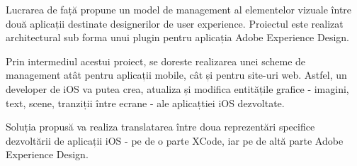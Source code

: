 
\par Lucrarea de față propune un model de management al elementelor vizuale între două aplicații destinate designerilor de user experience. Proiectul  este realizat architectural sub forma unui plugin pentru aplicația Adobe Experience Design. 
\par Prin intermediul acestui proiect, se doreste realizarea unei scheme de management atât pentru aplicații mobile, cât și pentru site-uri web. Astfel, un developer de iOS va putea crea, atualiza și modifica entitățile grafice - imagini, text, scene, tranziții între ecrane - ale aplicațtiei iOS dezvoltate. 
\par Soluția propusă va realiza translatarea între doua reprezentări specifice dezvoltării de aplicații iOS - pe de o parte XCode, iar pe de altă parte Adobe Experience Design. 


